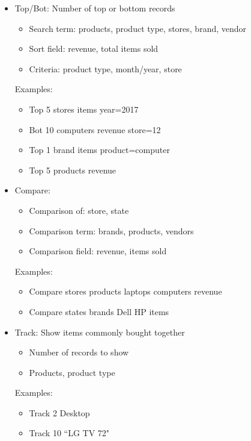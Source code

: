 \documentclass{article}
\begin{document}
\begin{itemize}
      \item
        Top/Bot: Number of top or bottom records
        \begin{itemize}
          \item Search term: products, product type, stores, brand, vendor
          \item Sort field: revenue, total items sold
          \item Criteria: product type, month/year, store
        \end{itemize}
        Examples:
        \begin{itemize}
          \item Top 5 stores items year=2017
          \item Bot 10 computers revenue store=12
          \item Top 1 brand items product=computer
          \item Top 5 products revenue
        \end{itemize}

      \item
        Compare:
        \begin{itemize}
          \item Comparison of: store, state
          \item Comparison term: brands, products, vendors
          \item Comparison field: revenue, items sold
        \end{itemize}
        Examples:
        \begin{itemize}
          \item Compare stores products laptops computers revenue 
          \item Compare states brands Dell HP items
        \end{itemize}

      \item
        Track: Show items commonly bought together
        \begin{itemize}
          \item Number of records to show
          \item Products, product type
        \end{itemize}
        Examples:
        \begin{itemize}
          \item Track 2 Desktop
          \item Track 10 ``LG TV 72"
        \end{itemize}
    \end{itemize}

  
\end{document}
